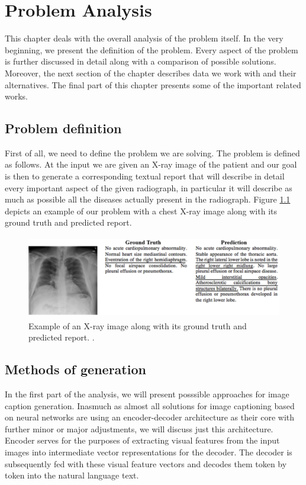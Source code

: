 \chapter{Problem Analysis}
This chapter deals with the overall analysis of the problem itself. In the very beginning, we present the definition of the problem. Every aspect of the problem is further discussed in detail along with a comparison of possible solutions. Moreover, the next section of the chapter describes data we work with and their alternatives. The final part of this chapter presents some of the important related works.

\section{Problem definition}
First of all, we need to define the problem we are solving. The problem is defined as follows. At the input we are given an X-ray image of the patient and our goal is then to generate a corresponding textual report that will describe in detail every important aspect of the given radiograph, in particular it will describe as much as possible all the diseases actually present in the radiograph. Figure \hyperref[fig01:ProblemExample]{1.1} depicts an example of our problem with a chest X-ray image along with its ground truth and predicted report. 

\begin{figure}[h]\centering
\includegraphics[width=120mm, height=36mm]{../img/ProblemExample}
\caption{Example of an X-ray image along with its ground truth and predicted report. \citet{jing2017automatic}.}
\label{fig01:ProblemExample}
\end{figure}

\section{Methods of generation}
\label{sec:methodsOfGeneration}
In the first part of the analysis, we will present posssible approaches for image caption generation. Inasmuch as almost all solutions for image captioning based on neural networks are using an encoder-decoder architecture as their core with further minor or major adjustments, we will discuss just this architecture. Encoder serves for the purposes of extracting visual features from the input images into intermediate vector representations for the decoder. The decoder is subsequently fed with these visual feature vectors and decodes them token by token into the natural language text.\\

